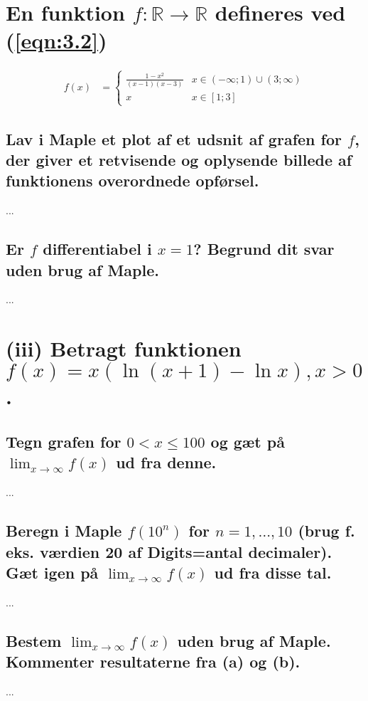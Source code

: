 \documentclass[11pt,a4paper]{article}
\newcommand{\limit}[2]{\lim_{#1 \rightarrow #2}}
\newcommand{\eqnref}[1]{(\ref{eqn:#1})}
\begin{document}
\section
{
    \mdseries
    En funktion $f : \mathbb{R} \rightarrow \mathbb{R}$ defineres ved
    \eqnref{3.2}
}
\begin{align}
    f(x) &=
    \begin{cases}
        \frac{1 - x^2}{(x -1)(x - 3)} &x \in (-\infty;1) \cup (3;\infty) \\
        x &x \in [1;3]
    \end{cases}
    \label{eqn:3.2}
\end{align}

\subsection
{
    \mdseries
    Lav i Maple et plot af et udsnit af grafen for $f$, der giver et
    retvisende og oplysende billede af funktionens overordnede opførsel.
}
...

\subsection
{
    \mdseries
    Er $f$ differentiabel i $x=1$? Begrund dit svar uden brug af Maple.
}
...


\section
{
    (iii) \mdseries
    Betragt funktionen $f(x) = x(\ln(x + 1) - \ln x), x > 0$.
}

\subsection
{
    \mdseries
    Tegn grafen for $0 < x \leq 100$ og gæt på $\limit{x}{\infty} f(x)$ ud
    fra denne.
}
...

\subsection
{
    \mdseries
    Beregn i Maple $f(10^n)$ for $n = 1, \dots, 10$ (brug f. eks. værdien 20
    af Digits=antal decimaler). Gæt igen på $\limit{x}{\infty} f(x)$ ud fra
    disse tal.
}
...

\subsection
{
    \mdseries
    Bestem $\limit{x}{\infty} f(x)$ uden brug af Maple. Kommenter resultaterne
    fra (a) og (b).
}
...
\end{document}
